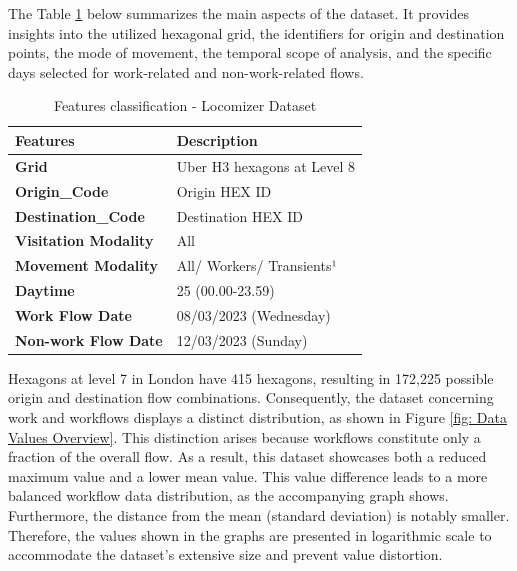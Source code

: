 The Table \ref{table: Locomizer features} below summarizes the main aspects of the dataset. It provides insights into the utilized hexagonal grid, the identifiers for origin and destination points, the mode of movement, the temporal scope of analysis, and the specific days selected for work-related and non-work-related flows.





\begin{table}[H]
\centering
\begin{tabular}{ll}
\hline
\textbf{Features}   & \textbf{Description}        \\ \hline
\textbf{Grid}               & Uber H3 hexagons at Level 8 \\
\textbf{Origin\_Code}        & Origin HEX ID               \\
\textbf{Destination\_Code}   & Destination HEX ID          \\
\textbf{Visitation Modality} & All                         \\
\textbf{Movement Modality}   & All/ Workers/ Transients¹   \\
\textbf{Daytime}             & 25 (00.00-23.59)            \\ 
\textbf{Work Flow Date}      & 08/03/2023 (Wednesday)      \\ 
\textbf{Non-work Flow Date}  & 12/03/2023 (Sunday)         \\ \bottomrule
\end{tabular}
    \caption{Features classification - Locomizer Dataset}
    \label{table: Locomizer features}
\end{table}

Hexagons at level 7 in London have 415 hexagons, resulting in 172,225 possible origin and destination flow combinations. Consequently, the dataset concerning work and workflows displays a distinct distribution, as shown in Figure \ref{fig: Data Values Overview}. This distinction arises because workflows constitute only a fraction of the overall flow. As a result, this dataset showcases both a reduced maximum value and a lower mean value. This value difference leads to a more balanced workflow data distribution, as the accompanying graph shows. Furthermore, the distance from the mean (standard deviation) is notably smaller. Therefore, the values shown in the graphs are presented in logarithmic scale to accommodate the dataset's extensive size and prevent value distortion.


